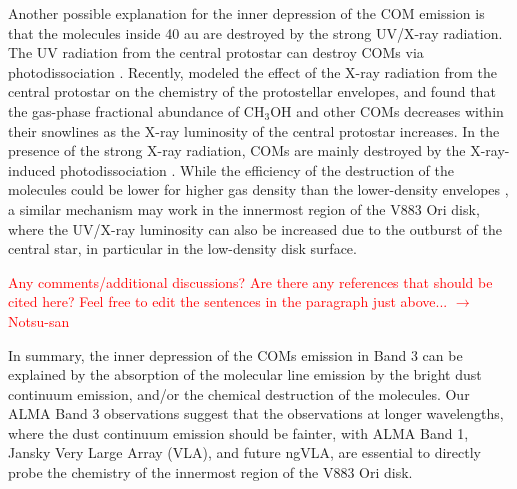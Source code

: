 \documentclass[linenumbers, twocolumn, twocolappendix, astrosymb, times]{aastex631}
\newcommand{\methanol}{CH$_3$OH\xspace}
\begin{document}
Another possible explanation for the inner depression of the COM emission is that the molecules inside 40 au are destroyed by the strong UV/X-ray radiation. The UV radiation from the central protostar can destroy COMs via photodissociation \citep[e.g.,][]{Garrod2006, Oberg2009}. Recently, \citet{Notsu2021} modeled the effect of the X-ray radiation from the central protostar on the chemistry of the protostellar envelopes, and found that the gas-phase fractional abundance of \methanol and other COMs decreases within their snowlines as the X-ray luminosity of the central protostar increases. In the presence of the strong X-ray radiation, COMs are mainly destroyed by the X-ray-induced photodissociation \citep[e.g.,][]{Garrod2006, Taquet2016, Notsu2021}. While the efficiency of the destruction of the molecules could be lower for higher gas density than the lower-density envelopes \citep{Notsu2021}, a similar mechanism may work in the innermost region of the V883 Ori disk, where the UV/X-ray luminosity can also be increased due to the outburst of the central star, in particular in the low-density disk surface.

\textcolor{red}{Any comments/additional discussions? Are there any references that should be cited here? Feel free to edit the sentences in the paragraph just above... $\to$ Notsu-san}

In summary, the inner depression of the COMs emission in Band 3 can be explained by the absorption of the molecular line emission by the bright dust continuum emission, and/or the chemical destruction of the molecules. Our ALMA Band 3 observations suggest that the observations at longer wavelengths, where the dust continuum emission should be fainter, with ALMA Band 1, Jansky Very Large Array (VLA), and future ngVLA, are essential to directly probe the chemistry of the innermost region of the V883 Ori disk.
\end{document}
